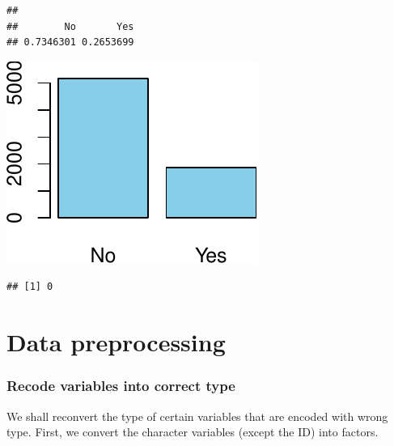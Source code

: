 \documentclass[
  twoside]{article}
\newenvironment{Shaded}{\begin{snugshade}}{\end{snugshade}}
\newcommand{\AttributeTok}[1]{\textcolor[rgb]{0.77,0.63,0.00}{#1}}
\newcommand{\FunctionTok}[1]{\textcolor[rgb]{0.00,0.00,0.00}{#1}}
\newcommand{\NormalTok}[1]{#1}
\newcommand{\SpecialCharTok}[1]{\textcolor[rgb]{0.00,0.00,0.00}{#1}}
\newcommand{\StringTok}[1]{\textcolor[rgb]{0.31,0.60,0.02}{#1}}
\begin{document}
\begin{verbatim}
## 
##        No       Yes 
## 0.7346301 0.2653699
\end{verbatim}

\begin{Shaded}
\end{Shaded}

\includegraphics{Assigment2_files/figure-latex/unnamed-chunk-37-1.pdf}

\begin{Shaded}
\end{Shaded}

\begin{verbatim}
## [1] 0
\end{verbatim}

\hypertarget{data-preprocessing}{%
\section{Data preprocessing}\label{data-preprocessing}}

\hypertarget{recode-variables-into-correct-type}{%
\subsubsection{Recode variables into correct
type}\label{recode-variables-into-correct-type}}

We shall reconvert the type of certain variables that are encoded with
wrong type. First, we convert the character variables (except the ID)
into factors.
\end{document}
